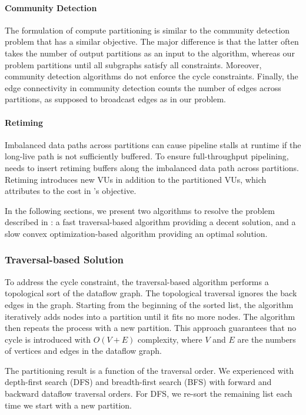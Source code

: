\paragraph{Community Detection}
The formulation of compute partitioning is similar to the community detection
problem\cite{community} that has a similar objective. 
The major difference is that the latter often takes the number of output partitions as an
input to the algorithm, whereas our problem partitions until all subgraphs satisfy all constraints.
Moreover, community detection algorithms do not enforce the cycle constraints. 
Finally, the edge connectivity in community detection counts the number of edges across partitions, 
as supposed to broadcast edges as in our problem.

\paragraph{Retiming}
Imbalanced data paths across partitions can cause pipeline stalls at runtime if the long-live path is not
sufficiently buffered.
To ensure full-throughput pipelining, \name needs to insert retiming buffers along the imbalanced data path across
partitions.
Retiming introduces new VUs in addition to the partitioned VUs, which attributes to the cost in
's objective.

In the following sections, we present two algorithms to resolve the problem described in
:
a fast traversal-based algorithm providing a decent solution, and a slow convex
optimization-based algorithm providing an optimal solution.

\subsubsection{Traversal-based Solution}
To address the cycle constraint, the traversal-based algorithm performs a topological sort of the dataflow graph.
The topological traversal ignores the back edges in the graph. 
Starting from the beginning of the sorted list, the algorithm iteratively adds nodes into a partition
until it fits no more nodes. The algorithm then repeats the process with a new partition.
This approach guarantees that no cycle is introduced with $O(V+E)$ complexity, 
where $V$ and $E$ are the numbers of vertices and edges in the dataflow graph.

The partitioning result is a function of the traversal order.
We experienced with depth-first search (DFS) and breadth-first search (BFS) with forward and
backward dataflow traversal orders.
For DFS, we re-sort the remaining list each time we start with a new partition.

